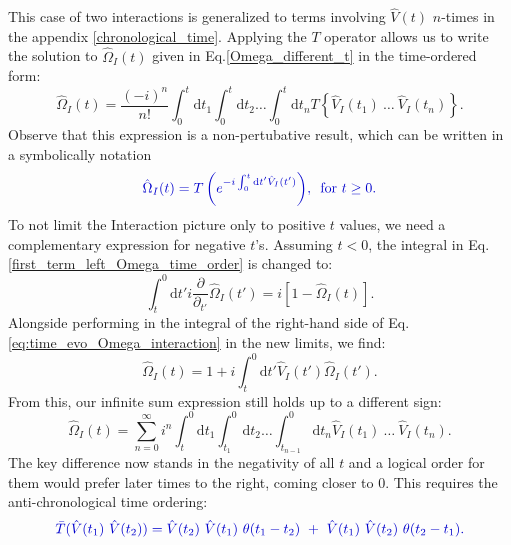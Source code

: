 \documentclass[
12pt, %
english, %
singlespacing, %
headsepline, %
]{MastersDoctoralThesis} %
\begin{document}
This case of two interactions is generalized to terms involving $\hat{V}(t) $ $ n $-times in the appendix \ref{chronological_time}.  
Applying the $ T $ operator allows us to write the solution to $ \hat{\Omega}_{I}(t) $ given in Eq.\enskip\eqref{Omega_different_t} in the time-ordered form:
\begin{equation}\label{Omega_I_long_timeorderd}
\hat{\Omega}_{I}(t)
=
\frac{(-i)^{n}}{n!}
\int_{0}^{t}\mathrm{d}t_1\int_{0}^{t}\! \! \mathrm{d}t_2
 \ldots
 \int_{0}^{t}\! \! \mathrm{d}t_n
 T\left\lbrace \hat{V}_{I}(t_1)\ \ldots \ \hat{V}_{I}(t_n)\right\rbrace 
 .
\end{equation}
Observe that this expression is a non-pertubative result, which can  be written in a symbolically notation
\begin{equation}\label{eq:Omega_I_Chron_0}
\textcolor[RGB]{0,0,204}{
\hat{\Omega}_{I}(t)
=T\left( e^{-i\int_{0}^{t}\mathrm{d}t^{\prime} \hat{V}_{I}(t^{\prime})} \right)
	\! ,\text{\enskip for  }  t\geq 0 
	.}
\end{equation}
To not limit the Interaction picture only to positive $ t $ values, we need a complementary expression for negative $ t $'s. Assuming $ t<0 $, the integral in Eq.\enskip\eqref{first_term_left_Omega_time_order} is changed to:
 \begin{equation}\label{first_term_left_anti_chrono}
 \int_{t}^{0}\mathrm{d}t'
 i
 \frac{\partial}{\partial_{t'}} 
 \hat{\Omega}_{I} (t')
 =
 i
 \left[ 
1 -\hat{\Omega}_{I}(t)
 \right] .
 \end{equation}
 Alongside performing in the integral of the right-hand side of  Eq.\enskip\eqref{eq:time_evo_Omega_interaction} in the new limits, we find:
 \begin{equation}
  \hat{\Omega}_{I}(t)=
1
+
i
\int^{0}_{t}\mathrm{d}t'\hat{V}_{I}(t')\hat{\Omega}_{I}(t')	.
  \end{equation} 
From this, our infinite sum expression still holds up to a different sign:
\begin{equation}\label{Omega_anti_without_anti}
\hat{\Omega}_{I}(t) =
\sum\limits_{n=0}^{\infty} 
i^{n}
\int^{0}_{t}\mathrm{d}t_1\int^{0}_{t_{1}}\! \! \mathrm{d}t_2
 \ldots
 \int^{0}_{t_{n-1}}\! \! \mathrm{d}t_n
  \hat{V}_{I}(t_1)\ \ldots \ \hat{V}_{I}(t_n).
\end{equation}
The key difference now stands in the negativity of all $ t $ and a logical order for them would prefer later times to the right, coming closer to $ 0 $. This requires the anti-chronological time ordering:
 \begin{equation}\label{eq:anti-chron-time_ordering}
\textcolor[RGB]{0,0,204}{
\bar{T}(\hat{V}(t_1)\ \hat{V}(t_2))=\hat{V}(t_2)\ \hat{V}(t_1)\ \theta (t_1 -t_2)\ +\ \hat{V}(t_1)\  \hat{V}(t_2) \ \theta (t_2-t_1)
.}
\end{equation}
\end{document}
